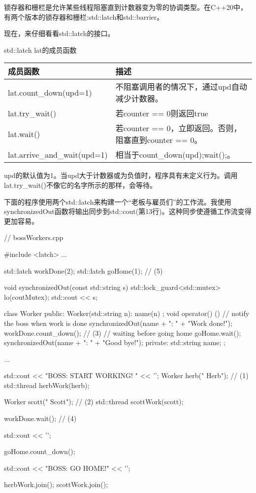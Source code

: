 锁存器和栅栏是允许某些线程阻塞直到计数器变为零的协调类型。在C++20中，有两个版本的锁存器和栅栏:std::latch和std::barrier。


现在，来仔细看看std::latch的接口。

\begin{center}
std::latch lat的成员函数
\end{center}

\begin{longtable}[c]{|l|l|}
\hline
\textbf{成员函数} & \textbf{描述}         \\ \hline
\endfirsthead
%
\endhead
%
lat.count\_down(upd=1)       & 不阻塞调用者的情况下，通过upd自动减少计数器。  \\ \hline
lat.try\_wait()          & 若counter == 0则返回true \\ \hline
lat.wait()                   & 若counter == 0，立即返回。否则，阻塞直到counter == 0。 \\ \hline
lat.arrive\_and\_wait(upd=1) & 相当于count\_down(upd);wait();。                                \\ \hline
\end{longtable}

upd的默认值为1。当upd大于计数器或为负值时，程序具有未定义行为。调用lat.try\_wait()不像它的名字所示的那样，会等待。

下面的程序使用两个std::latch来构建一个“老板与雇员们”的工作流。我使用synchronizedOut函数将输出同步到std::cout(第13行)。这种同步使遵循工作流变得更加容易。


\begin{cpp}
// bossWorkers.cpp

#include <latch>
...

std::latch workDone(2);
std::latch goHome(1); // (5)

void synchronizedOut(const std::string s) {
	std::lock_guard<std::mutex> lo(coutMutex);
	std::cout << s;
}

class Worker {
public:
	Worker(std::string n): name(n) { };
	void operator() (){
		// notify the boss when work is done
		synchronizedOut(name + ": " + "Work done!\n");
		workDone.count_down(); // (3)
		// waiting before going home
		goHome.wait();
		synchronizedOut(name + ": " + "Good bye!\n");
	}
private:
	std::string name;
};

...

std::cout << "BOSS: START WORKING! " << '\n';
Worker herb("   Herb"); // (1)
std::thread herbWork(herb);

Worker scott("    Scott"); // (2)
std::thread scottWork(scott);

workDone.wait(); // (4)

std::cout << '\n';

goHome.count_down();

std::cout << "BOSS: GO HOME!" << '\n';

herbWork.join();
scottWork.join();
\end{cpp}

